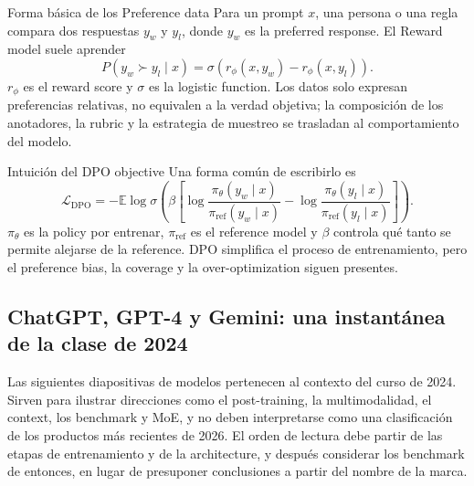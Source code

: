 
\begin{importantbox}{Forma básica de los Preference data}
Para un prompt $x$, una persona o una regla compara dos respuestas $y_w$ y $y_l$, donde $y_w$ es la preferred response. El Reward model suele aprender
\[
P(y_w\succ y_l\mid x)=\sigma\!\left(r_\phi(x,y_w)-r_\phi(x,y_l)\right).
\]
$r_\phi$ es el reward score y $\sigma$ es la logistic function. Los datos solo expresan preferencias relativas, no equivalen a la verdad objetiva; la composición de los anotadores, la rubric y la estrategia de muestreo se trasladan al comportamiento del modelo.
\end{importantbox}


\begin{importantbox}{Intuición del DPO objective}
Una forma común de escribirlo es
\[
\mathcal{L}_{\mathrm{DPO}}=-\mathbb{E}\log\sigma\!\left(\beta\left[
\log\frac{\pi_\theta(y_w\mid x)}{\pi_{\mathrm{ref}}(y_w\mid x)}-
\log\frac{\pi_\theta(y_l\mid x)}{\pi_{\mathrm{ref}}(y_l\mid x)}
\right]\right).
\]
$\pi_\theta$ es la policy por entrenar, $\pi_{\mathrm{ref}}$ es el reference model y $\beta$ controla qué tanto se permite alejarse de la reference. DPO simplifica el proceso de entrenamiento, pero el preference bias, la coverage y la over-optimization siguen presentes.
\end{importantbox}


\subsection{ChatGPT, GPT-4 y Gemini: una instantánea de la clase de 2024}

Las siguientes diapositivas de modelos pertenecen al contexto del curso de 2024. Sirven para ilustrar direcciones como el post-training, la multimodalidad, el context, los benchmark y MoE, y no deben interpretarse como una clasificación de los productos más recientes de 2026. El orden de lectura debe partir de las etapas de entrenamiento y de la architecture, y después considerar los benchmark de entonces, en lugar de presuponer conclusiones a partir del nombre de la marca.

